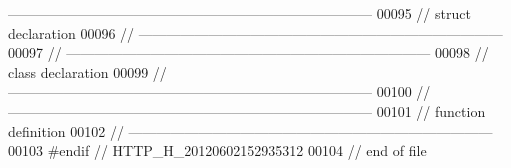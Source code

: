 \begin{DoxyCode}
{      ------------------------------------------------------------------------------}
00095 \textcolor{comment}{// struct declaration}
00096 \textcolor{comment}{//
      ------------------------------------------------------------------------------}
00097 \textcolor{comment}{//
      ------------------------------------------------------------------------------}
00098 \textcolor{comment}{// class declaration}
00099 \textcolor{comment}{//
      ------------------------------------------------------------------------------}
00100 \textcolor{comment}{//
      ------------------------------------------------------------------------------}
00101 \textcolor{comment}{// function definition}
00102 \textcolor{comment}{//
      ------------------------------------------------------------------------------}
00103 \textcolor{preprocessor}{#endif // HTTP\_H\_20120602152935312}
00104 \textcolor{preprocessor}{}\textcolor{comment}{// end of file}
\end{DoxyCode}
